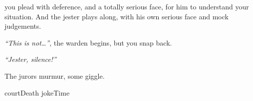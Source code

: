 you plead with deference, and a totally serious face, for him to understand your situation.
And the jester plays along, with his own serious face and mock judgements.

\textit{``This is not\ldots''}, the \gls{warden} begins, but you snap back.

\textit{``Jester, silence!''}

The jurors murmur, some giggle.

\begin{selectPath}
  {}%
  {courtDeath}
  {}%
  {jokeTime}
\end{selectPath}



